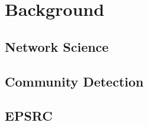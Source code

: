 \chapter{Background}
\label{chapterlabel2}

\section{Network Science}

\blindtext

\section{Community Detection}

\blindtext

\section{EPSRC}

\blindtext